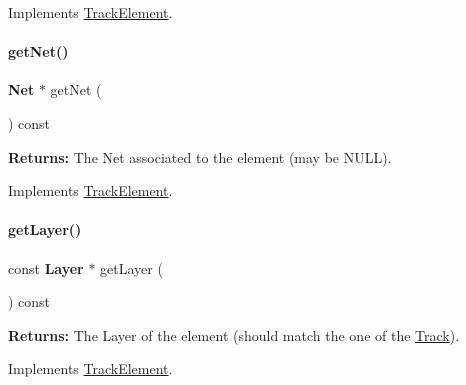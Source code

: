 Implements \hyperlink{classKite_1_1TrackElement_ae35b78590ed6aa546b626ef95f28c533}{Track\+Element}.

\mbox{\label{classKite_1_1TrackSegment_a692492374623a5c6096b2c4a51190359}} 
\paragraph{\texorpdfstring{get\+Net()}{getNet()}}
{\footnotesize\ttfamily \textbf{ Net} $\ast$ get\+Net (\begin{DoxyParamCaption}{ }\end{DoxyParamCaption}) const\hspace{0.3cm}{\ttfamily [virtual]}}

{\bfseries Returns\+:} The Net associated to the element (may be {\ttfamily N\+U\+LL}). 

Implements \hyperlink{classKite_1_1TrackElement_a2b383a5b6f5028911a35e446a682dabd}{Track\+Element}.

\mbox{\label{classKite_1_1TrackSegment_ab045567c4f529dca7790d66c17c3084f}} 
\paragraph{\texorpdfstring{get\+Layer()}{getLayer()}}
{\footnotesize\ttfamily const \textbf{ Layer} $\ast$ get\+Layer (\begin{DoxyParamCaption}{ }\end{DoxyParamCaption}) const\hspace{0.3cm}{\ttfamily [virtual]}}

{\bfseries Returns\+:} The Layer of the element (should match the one of the \hyperlink{classKite_1_1Track}{Track}). 

Implements \hyperlink{classKite_1_1TrackElement_ad96c66549598873bf68c2e18ec7164c1}{Track\+Element}.

\mbox{\label{classKite_1_1TrackSegment_aa7552c20cc46abcac558627b2ca341f8}} 

